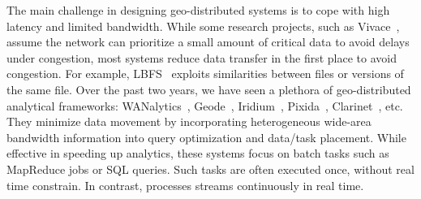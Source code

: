  The main challenge in designing geo-distributed
systems is to cope with high latency and limited bandwidth. While some research
projects, such as Vivace~\cite{cho2012surviving}, assume the network can
prioritize a small amount of critical data to avoid delays under congestion,
most systems reduce data transfer in the first place to avoid congestion. For
example, LBFS~\cite{muthitacharoen2001low} exploits similarities between files
or versions of the same file. Over the past two years, we have seen a plethora
of geo-distributed analytical frameworks:
WANalytics~\cite{vulimiri2015wananlytics}, Geode~\cite{vulimiri2015global},
Iridium~\cite{pu2015low}, Pixida~\cite{kloudas2015pixida},
Clarinet~\cite{viswanathan2016clarinet}, etc. They minimize data movement by
incorporating heterogeneous wide-area bandwidth information into query
optimization and data/task placement. While effective in speeding up analytics,
these systems focus on batch tasks such as MapReduce jobs or SQL queries. Such
tasks are often executed once, without real time constrain. In contrast,
\sysname{} processes streams continuously in real time.









